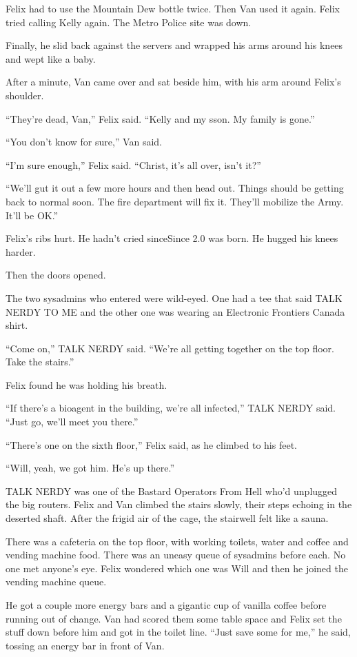 \tb

Felix had to use the Mountain Dew bottle twice. Then Van used it
again. Felix tried calling Kelly again. The Metro Police site was
down.

Finally, he slid back against the servers and wrapped his arms
around his knees and wept like a baby.

After a minute, Van came over and sat beside him, with his arm
around Felix’s shoulder.

“They’re dead, Van,” Felix said. “Kelly and my s\dash{}son. My family is
gone.”

“You don’t know for sure,” Van said.

“I’m sure enough,” Felix said. “Christ, it’s all over, isn’t it?”

“We’ll gut it out a few more hours and then head out. Things should
be getting back to normal soon. The fire department will fix it.
They’ll mobilize the Army. It’ll be OK.”

Felix’s ribs hurt. He hadn’t cried since\dash{}Since 2.0 was born. He
hugged his knees harder.

Then the doors opened.

The two sysadmins who entered were wild-eyed. One had a tee that
said TALK NERDY TO ME and the other one was wearing an Electronic
Frontiers Canada shirt.

“Come on,” TALK NERDY said. “We’re all getting together on the top
floor. Take the stairs.”

Felix found he was holding his breath.

“If there’s a bioagent in the building, we’re all infected,” TALK
NERDY said. “Just go, we’ll meet you there.”

“There’s one on the sixth floor,” Felix said, as he climbed to his
feet.

“Will, yeah, we got him. He’s up there.”

TALK NERDY was one of the Bastard Operators From Hell who’d
unplugged the big routers. Felix and Van climbed the stairs slowly,
their steps echoing in the deserted shaft. After the frigid air of
the cage, the stairwell felt like a sauna.

There was a cafeteria on the top floor, with working toilets, water
and coffee and vending machine food. There was an uneasy queue of
sysadmins before each. No one met anyone’s eye. Felix wondered
which one was Will and then he joined the vending machine queue.

He got a couple more energy bars and a gigantic cup of vanilla
coffee before running out of change. Van had scored them some table
space and Felix set the stuff down before him and got in the toilet
line. “Just save some for me,” he said, tossing an energy bar in
front of Van.

